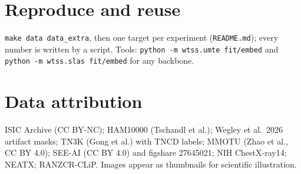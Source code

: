 \documentclass[11pt,a4paper]{article}
\begin{document}
\section{Reproduce and reuse}
\texttt{make data data\_extra}, then one target per experiment (\texttt{README.md}); every number is written by a script.
Tools: \texttt{python -m wtss.umte fit/embed} and \texttt{python -m wtss.slas fit/embed} for any backbone.

\section*{Data attribution}
ISIC Archive (CC BY-NC); HAM10000 (Tschandl et al.); Wegley et al.\ 2026 artifact masks; TN3K (Gong et al.) with TNCD
labels; MMOTU (Zhao et al., CC BY 4.0); SEE-AI (CC BY 4.0) and figshare 27645021; NIH ChestX-ray14; NEATX; RANZCR-CLiP.
Images appear as thumbnails for scientific illustration.
\end{document}
